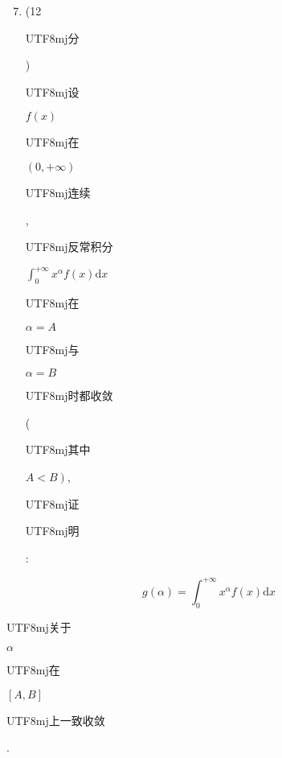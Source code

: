 \documentclass[10pt]{article}
\begin{document}
\begin{enumerate}
  \setcounter{enumi}{6}
  \item (12 \begin{CJK}{UTF8}{mj}分\end{CJK}) \begin{CJK}{UTF8}{mj}设\end{CJK} $f(x)$ \begin{CJK}{UTF8}{mj}在\end{CJK} $(0,+\infty)$ \begin{CJK}{UTF8}{mj}连续\end{CJK}, \begin{CJK}{UTF8}{mj}反常积分\end{CJK} $\int_{0}^{+\infty} x^{\alpha} f(x) \mathrm{d} x$ \begin{CJK}{UTF8}{mj}在\end{CJK} $\alpha=A$ \begin{CJK}{UTF8}{mj}与\end{CJK} $\alpha=B$ \begin{CJK}{UTF8}{mj}时都收敛\end{CJK} (\begin{CJK}{UTF8}{mj}其中\end{CJK} $\left.A<B\right)$, \begin{CJK}{UTF8}{mj}证\end{CJK} \begin{CJK}{UTF8}{mj}明\end{CJK}:
\end{enumerate}
$$
g(\alpha)=\int_{0}^{+\infty} x^{\alpha} f(x) \mathrm{d} x
$$
\begin{CJK}{UTF8}{mj}关于\end{CJK} $\alpha$ \begin{CJK}{UTF8}{mj}在\end{CJK} $[A, B]$ \begin{CJK}{UTF8}{mj}上一致收敛\end{CJK}.
\end{document}

